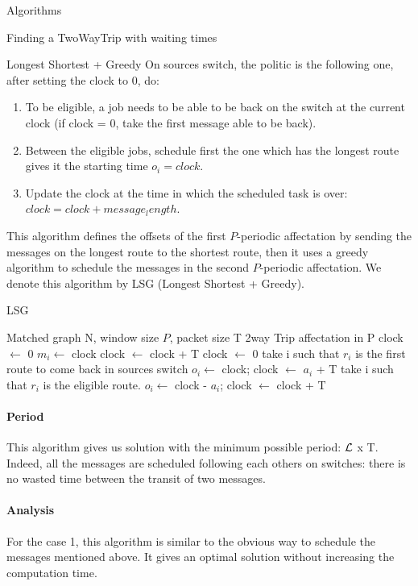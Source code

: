 \documentclass[a4paper,10pt]{report}
\begin{document}
\begin{chapter}{Algorithms}
\begin{section}{Finding a TwoWayTrip with waiting times}
\begin{subsection}{Longest Shortest + Greedy}
On sources switch, the politic is the following one, after setting the clock to 0, do:
\begin{enumerate}
 \item To be eligible, a job needs to be able to be back on the switch at the current clock (if clock = 0, take the first message able to be back).
 \item Between the eligible jobs, schedule first the one which has the longest route gives it the starting time $o_i = clock$.
 \item Update the clock at the time in which the scheduled task is over: $clock = clock + message_length$.
\end{enumerate}

This algorithm defines the offsets of the first $P$-periodic affectation by sending the messages on the longest route to the shortest route, then it uses a greedy algorithm to schedule the messages in the second $P$-periodic affectation. We denote this algorithm by LSG (Longest Shortest + Greedy).

\begin{algorithm}[H]
\caption{LSG}
\begin{algorithmic}
\REQUIRE Matched graph N, window size $P$, packet size T
\ENSURE 2way Trip affectation in P
\STATE clock $\leftarrow$ 0
\STATE  $m_i \leftarrow$ clock
\STATE clock $\leftarrow$ clock + T
\ENDFOR
\STATE clock $\leftarrow$ 0
\STATE take i such that $r_i$ is the first route to come back in sources switch
\STATE $o_i \leftarrow $ clock;
\STATE clock $\leftarrow$ $a_i$ + T
\STATE take i such that $r_i$ is the eligible route.
\STATE $o_i \leftarrow $ clock - $a_i$;
\STATE clock $\leftarrow$ clock + T

\ENDWHILE

\end{algorithmic}
\end{algorithm}


\paragraph{Period}
This algorithm gives us solution with the minimum possible period: ${\cal L}$ x T. Indeed, all the messages are scheduled following each others on switches:
there is no wasted time between the transit of two messages.

\paragraph{Analysis}
For the case 1, this algorithm is similar to the obvious way to schedule the messages mentioned above. It gives an optimal solution without increasing 
the computation time.


\end{subsection}
\end{section}
\end{chapter}
\end{document}
